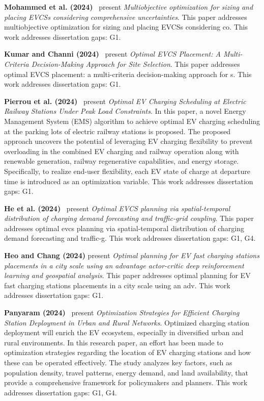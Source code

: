 \documentclass[letterpaper, 12pt, oneside, doublespacing]{Thesis}
\begin{document}
\noindent \textbf{Mohammed et al. (2024)}~\cite{multiobjective_optimization_2024} present \textit{Multiobjective optimization for sizing and placing EVCSs considering comprehensive uncertainties}. This paper addresses multiobjective optimization for sizing and placing EVCSs considering co. This work addresses dissertation gaps: G1.



\noindent \textbf{Kumar and Channi (2024)}~\cite{optimizing_electric_2024} present \textit{Optimal EVCS Placement: A Multi-Criteria Decision-Making Approach for Site Selection}. This paper addresses optimal EVCS placement: a multi-criteria decision-making approach for s. This work addresses dissertation gaps: G1.



\noindent \textbf{Pierrou et al. (2024)}~\cite{optimal_ev_2024} present \textit{Optimal EV Charging Scheduling at Electric Railway Stations Under Peak Load Constraints}. In this paper, a novel Energy Management System (EMS) algorithm to achieve optimal EV charging scheduling at the parking lots of electric railway stations is proposed. The proposed approach uncovers the potential of leveraging EV charging flexibility to prevent overloading in the combined EV charging and railway operation along with renewable generation, railway regenerative capabilities, and energy storage. Specifically, to realize end-user flexibility, each EV state of charge at departure time is introduced as an optimization variable. This work addresses dissertation gaps: G1.



\noindent \textbf{He et al. (2024)}~\cite{optimal_evcs_2024} present \textit{Optimal EVCS planning via spatial-temporal distribution of charging demand forecasting and traffic-grid coupling}. This paper addresses optimal evcs planning via spatial-temporal distribution of charging demand forecasting and traffic-g. This work addresses dissertation gaps: G1, G4.



\noindent \textbf{Heo and Chang (2024)} present \textit{Optimal planning for EV fast charging stations placements in a city scale using an advantage actor-critic deep reinforcement learning and geospatial analysis}. This paper addresses optimal planning for EV fast charging stations placements in a city scale using an adv. This work addresses dissertation gaps: G1.



\noindent \textbf{Panyaram (2024)}~\cite{optimization_strategies_2024} present \textit{Optimization Strategies for Efficient Charging Station Deployment in Urban and Rural Networks}. Optimized charging station deployment will enrich the EV ecosystem, especially in diversified urban and rural environments. In this research paper, an effort has been made to optimization strategies regarding the location of EV charging stations and how these can be operated effectively. The study analyzes key factors, such as population density, travel patterns, energy demand, and land availability, that provide a comprehensive framework for policymakers and planners. This work addresses dissertation gaps: G1, G4.
\end{document}
